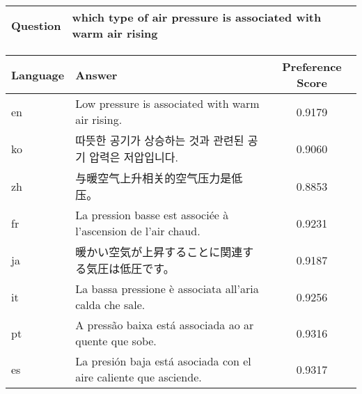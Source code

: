 

\begin{table*}[ht]
\centering
\begin{tabular}{ll}
\toprule
\textbf{Question} & which type of air pressure is associated with warm air rising \\
\bottomrule
\end{tabular}


\begin{tabular}{l p{10cm} c}
\toprule
\textbf{Language} & \textbf{Answer} & \textbf{Preference Score} \\
\midrule
en & Low pressure is associated with warm air rising. & 0.9179 \\
ko & 따뜻한 공기가 상승하는 것과 관련된 공기 압력은 저압입니다. & 0.9060 \\
zh & 与暖空气上升相关的空气压力是低压。 & 0.8853 \\
fr & La pression basse est associée à l'ascension de l'air chaud. & 0.9231 \\
ja & 暖かい空気が上昇することに関連する気圧は低圧です。 & 0.9187 \\
it & La bassa pressione è associata all'aria calda che sale. & 0.9256 \\
pt & A pressão baixa está associada ao ar quente que sobe. & 0.9316 \\
es & La presión baja está asociada con el aire caliente que asciende. & 0.9317 \\
\bottomrule
\end{tabular}
\caption{An example of generated answers in different languages with gpt-4o-mini. Also, we report the average similarity score between each pair of answers.}
\label{tab:case_generation}
\end{table*}
